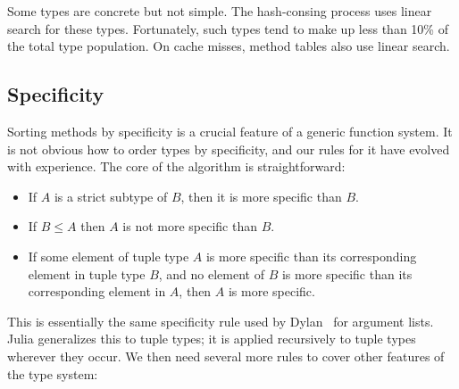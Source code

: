 Some types are concrete but not simple.
The hash-consing process uses linear search for these types.
Fortunately, such types tend to make up less than 10\% of the total
type population.
On cache misses, method tables also use linear search.


\subsection{Specificity}

Sorting methods by specificity is a crucial feature of a generic
function system.
It is not obvious how to order types by specificity, and our
rules for it have evolved with experience.
The core of the algorithm is straightforward:

\begin{itemize}
\item If $A$ is a strict subtype of $B$, then it is more specific than $B$.
\item If $B\leq A$ then $A$ is not more specific than $B$.
\item If some element of tuple type $A$ is more specific than its corresponding
element in tuple type $B$, and no element of $B$ is more specific than its
corresponding element in $A$, then $A$ is more specific.
\end{itemize}


This is essentially the same specificity rule used by Dylan~\cite{dylanlang}
for argument lists.
Julia generalizes this to tuple types; it is applied recursively to tuple
types wherever they occur.
We then need several more rules to cover other features of the type system:

